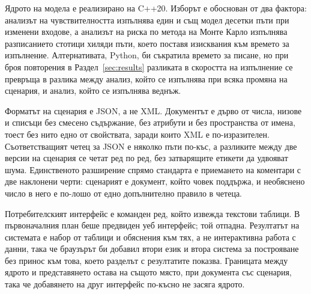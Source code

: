 Ядрото на модела е реализирано на C++20. Изборът е обоснован от два фактора:
анализът на чувствителността изпълнява един и същ модел десетки пъти при изменени
входове, а анализът на риска по метода на Монте Карло изпълнява разписанието
стотици хиляди пъти, което поставя изисквания към времето за изпълнение.
Алтернативата, Python, би съкратила времето за писане, но при броя повторения в
Раздел~\ref{sec:results} разликата в скоростта на изпълнение се превръща в
разлика между анализ, който се изпълнява при всяка промяна на сценария, и анализ,
който се изпълнява веднъж.

Форматът на сценария е JSON, а не XML. Документът е дърво от числа, низове и
списъци без смесено съдържание, без атрибути и без пространства от имена, тоест
без нито едно от свойствата, заради които XML е по-изразителен. Съответстващият
четец за JSON е няколко пъти по-къс, а разликите между две версии на сценария се
четат ред по ред, без затварящите етикети да удвояват шума. Единственото
разширение спрямо стандарта е приемането на коментари с две наклонени черти:
сценарият е документ, който човек поддържа, и необяснено число в него е по-лошо
от едно допълнително правило в четеца.

Потребителският интерфейс е команден ред, който извежда текстови таблици. В
първоначалния план беше предвиден уеб интерфейс; той отпадна. Резултатът на
системата е набор от таблици и обяснения към тях, а не интерактивна работа с
данни, така че браузърът би добавил втори език и втора система за построяване без
принос към това, което разделът с резултатите показва. Границата между ядрото и
представянето остава на същото място, при документа със сценария, така че
добавянето на друг интерфейс по-късно не засяга ядрото.
